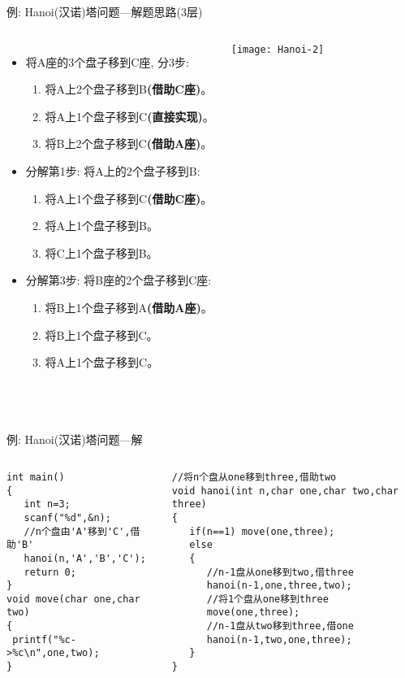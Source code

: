 \begin{frame}[shrink]{例: Hanoi(汉诺)塔问题---解题思路(3层)}
\vspace{-0.4cm}
\begin{columns}[T]
	\begin{itemize}
		\item 将A座的3个盘子移到C座, 分3步:
		\begin{enumerate}
			\item 将A上2个盘子移到B\textbf{(借助C座)}。
			\item 将A上1个盘子移到C\textbf{(直接实现)}。
			\item 将B上2个盘子移到C\textbf{(借助A座)}。
		\end{enumerate}
	    \item 分解第1步: 将A上的2个盘子移到B:
	    \begin{enumerate}
	    	\item 将A上1个盘子移到C\textbf{(借助C座)}。
	    	\item 将A上1个盘子移到B。
	    	\item 将C上1个盘子移到B。
	    \end{enumerate}
        \item 分解第3步: 将B座的2个盘子移到C座:
        \begin{enumerate}
        	\item 将B上1个盘子移到A\textbf{(借助A座)}。
        	\item 将B上1个盘子移到C。
        	\item 将A上1个盘子移到C。
        \end{enumerate}
	\end{itemize}
	\texttt{[image: Hanoi-2]}
\end{columns}
~\\
\end{frame}

\begin{frame}{例: Hanoi(汉诺)塔问题---解}
\vspace{-0.4cm}
\begin{columns}[T]
\begin{lstlisting}
int main()
{
   int n=3;
   scanf("%d",&n);
   //n个盘由'A'移到'C',借助'B'
   hanoi(n,'A','B','C');
   return 0;
}
void move(char one,char two)
{
 printf("%c->%c\n",one,two);
}
\end{lstlisting}
\begin{lstlisting}[frame=leftline]
//将n个盘从one移到three,借助two
void hanoi(int n,char one,char two,char three)
{
   if(n==1) move(one,three); 
   else
   {
      //n-1盘从one移到two,借three
      hanoi(n-1,one,three,two); 
      //将1个盘从one移到three
      move(one,three); 
      //n-1盘从two移到three,借one
      hanoi(n-1,two,one,three); 
   }
}
\end{lstlisting}
\end{columns}
~\\
\end{frame}

